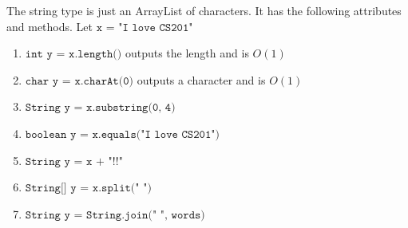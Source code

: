 \documentclass{article}
\begin{document}
    \begin{example}[String]
    The string type is just an ArrayList of characters. It has the following attributes and methods. Let $\texttt{x = "I love CS201"}$ 
    \begin{enumerate}
        \item $\texttt{int y = x.length()}$ outputs the length and is $O(1)$ 
        \item $\texttt{char y = x.charAt(0)}$ outputs a character and is $O(1)$
        \item $\texttt{String y = x.substring(0, 4)}$ 
        \item $\texttt{boolean y = x.equals("I love CS201")}$
        \item $\texttt{String y = x + "!!"}$ 
        \item $\texttt{String[] y = x.split(" ")}$
        \item $\texttt{String y = String.join(" ", words)}$
    \end{enumerate}
    \end{example}
\end{document}
